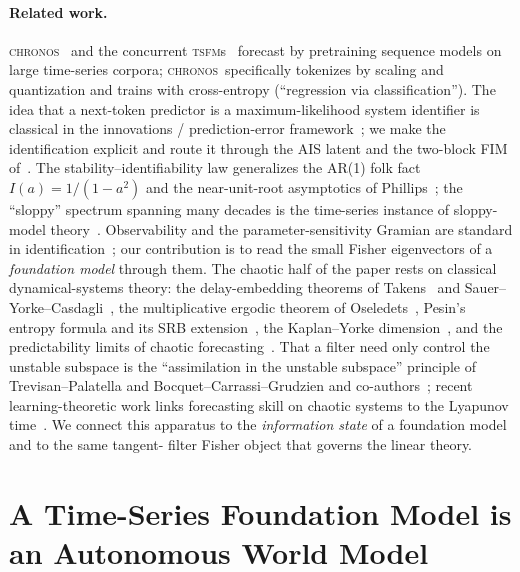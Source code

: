 \documentclass[10pt]{article}
\theoremstyle{plain}
\theoremstyle{definition}
\theoremstyle{remark}
\newcommand{\TSFM}{\textsc{tsfm}}
\newcommand{\Chronos}{\textsc{chronos}}
\begin{document}
\paragraph{Related work.}
\Chronos~\cite{chronos} and the concurrent \TSFM s~\cite{das2023,woo2024,%
rasul2023,goswami2024} forecast by pretraining sequence models on large time-series
corpora; \Chronos\ specifically tokenizes by scaling and quantization and trains
with cross-entropy (``regression via classification''). The idea that a
next-token predictor is a maximum-likelihood system identifier is classical in
the innovations / prediction-error framework~\cite{ljung1999,cappe2005}; we make
the identification explicit and route it through the AIS latent and the two-block
FIM of~\cite{wamvla}. The stability--identifiability law generalizes the AR(1)
folk fact $I(a)=1/(1-a^2)$ and the near-unit-root asymptotics of
Phillips~\cite{phillips1987}; the ``sloppy'' spectrum spanning many decades is
the time-series instance of sloppy-model
theory~\cite{transtrum2015,gutenkunst2007}. Observability and the
parameter-sensitivity Gramian are standard in
identification~\cite{ljung1999,bellman1970}; our contribution is to read the
small Fisher eigenvectors of a \emph{foundation model} through them. The chaotic
half of the paper rests on classical dynamical-systems theory: the delay-embedding
theorems of Takens~\cite{takens1981} and Sauer--Yorke--Casdagli~\cite{sauer1991},
the multiplicative ergodic theorem of Oseledets~\cite{oseledets1968}, Pesin's
entropy formula and its SRB extension~\cite{pesin1977,ledrappieryoung1985,%
young2002}, the Kaplan--Yorke dimension~\cite{kaplanyorke1979}, and the
predictability limits of chaotic forecasting~\cite{lorenz1963,lorenz1996}. That a
filter need only control the unstable subspace is the ``assimilation in the
unstable subspace'' principle of Trevisan--Palatella and
Bocquet--Carrassi--Grudzien and co-authors~\cite{trevisan2011,bocquet2017,%
gurumoorthy2017}; recent learning-theoretic work links forecasting skill on
chaotic systems to the Lyapunov time~\cite{pathak2018}. We connect this apparatus
to the \emph{information state} of a foundation model and to the same tangent-%
filter Fisher object that governs the linear theory.

\section{A Time-Series Foundation Model is an Autonomous World Model}
\label{sec:model}
\end{document}
